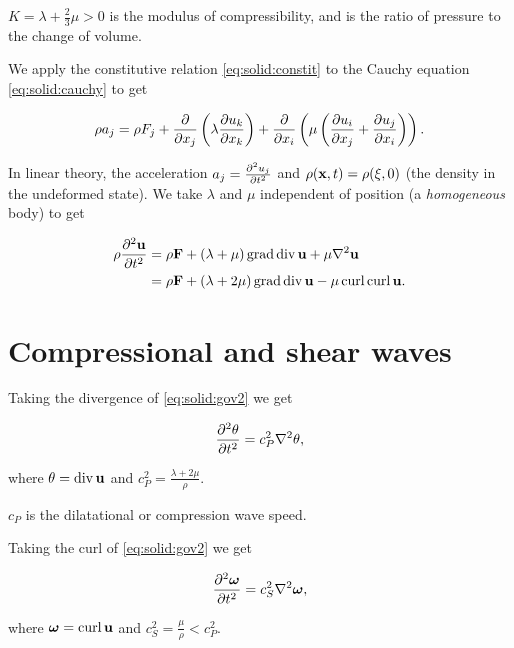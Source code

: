 \documentclass{notes}
\newcommand{\bs}[1]{\boldsymbol{#1}}
\DeclareMathOperator{\dive}{div}
\DeclareMathOperator{\curl}{curl}
\DeclareMathOperator{\grad}{grad}
\begin{document}
$K = \lambda + \tfrac{2}{3} \mu > 0$ is the modulus of compressibility,
and is the ratio of pressure to the change of volume.

We apply the constitutive relation \eqref{eq:solid:constit} to the
Cauchy equation \eqref{eq:solid:cauchy} to get

\begin{equation}\label{eq:solid:gov1}
\rho a_j = \rho F_j + \frac{\partial }{\partial x_j} \left( \lambda \frac{\partial u_k}{\partial x_k} \right)
+ \frac{\partial }{\partial x_i} \left( \mu \left( \frac{\partial u_i}{\partial x_j} + \frac{\partial u_j}{\partial x_i} \right) \right).
\end{equation}

In linear theory, the acceleration $a_j = \frac{\partial ^2 u_j}{\partial t^2}$ and
$\rho(\mathbf{x},t) = \rho(\xi,0)$ (the density in the undeformed state).  We
take $\lambda$ and $\mu$ independent of position (a \emph{homogeneous} body)
to get

\begin{equation}\label{eq:solid:gov2}
\begin{aligned}
\rho \pd{^2 \vu}{t^2} &= \rho \vF + \left( \lambda + \mu \right) \grad \dive
\vu + \mu \nabla^2 \vu \\
&=\rho \vF + \left( \lambda + 2 \mu \right) \grad \dive \vu
- \mu \curl \curl \vu.
\end{aligned}
\end{equation}

\section{Compressional and shear waves}

\newcommand{\vort}{\bs\omega}

Taking the divergence of \eqref{eq:solid:gov2} we get

\begin{equation}\label{eq:solid:compwave}
\frac{\partial ^2 \theta}{\partial t^2} = c_P^2 \nabla^2 \theta,
\end{equation}

where $\theta = \dive \vu$ and $c_P^2 = \tfrac{\lambda + 2 \mu}{\rho}$.

$c_P$ is the dilatational or compression wave speed.

Taking the curl of \eqref{eq:solid:gov2} we get

\begin{equation}\label{eq:solid:shear}
\pd{^2 \vort}{t^2} = c_S^2 \nabla^2 \vort,
\end{equation}

where $\vort = \curl \vu$ and $c_S^2 = \tfrac{\mu}{\rho} < c_P^2$.
\end{document}
